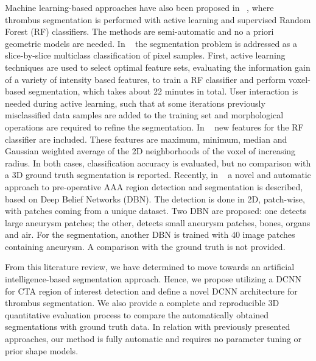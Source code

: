 \documentclass[preprint,authoryear,12pt]{elsarticle}
\begin{document}
Machine learning-based approaches have also been proposed in ~\citep{Mai12, Mai14}, where thrombus segmentation is performed with active learning and supervised Random Forest (RF) classifiers. The methods are semi-automatic and no a priori geometric models are needed. In ~\citep{Mai12} the segmentation problem is addressed as a slice-by-slice multiclass classification of pixel samples. First, active learning techniques are used to select optimal feature sets, evaluating the information gain of a variety of intensity based features, to train a RF classifier and perform voxel-based segmentation, which takes about 22 minutes in total.  User interaction is needed during active learning, such that at some iterations previously misclassified data samples are added to the training set and morphological operations are required to refine the segmentation. In ~\citep{Mai14} new features for the RF classifier are included. These features are maximum, minimum, median and Gaussian weighted average of the 2D neighborhoods of the voxel of increasing radius. In both cases, classification accuracy is evaluated, but no comparison with a 3D ground truth segmentation is reported. Recently, in ~\citep{Aik16} a novel and automatic approach to pre-operative AAA region detection and segmentation is described, based on Deep Belief Networks (DBN). The detection is done in 2D, patch-wise, with patches coming from a unique dataset.  Two DBN are proposed: one detects large aneurysm patches; the other, detects small aneurysm patches, bones, organs and air. For the segmentation, another DBN is trained with 40 image patches containing aneurysm. A comparison with the ground truth is not provided. \par
From this literature review, we have determined to move towards an artificial intelligence-based segmentation approach. Hence, we propose utilizing a DCNN for CTA region of interest detection and define a novel DCNN architecture for thrombus segmentation. We also provide a complete and reproducible 3D quantitative evaluation process to compare the automatically obtained segmentations with ground truth data. In relation with previously presented approaches, our method is fully automatic and requires no parameter tuning or prior shape models. 
\end{document}
